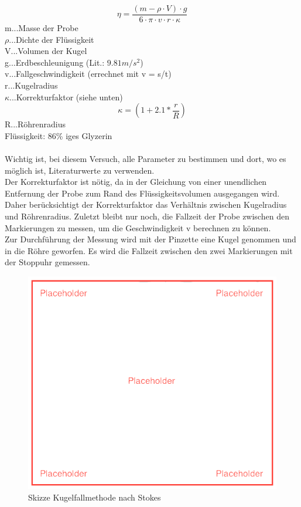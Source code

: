 \documentclass[12pt,a4paper]{article}
\begin{document}
\begin{multicols}{2}
$$\eta = \frac{(m-\rho \cdot V) \cdot g}{6 \cdot \pi \cdot v \cdot r \cdot \kappa}$$
m...Masse der Probe\\
$\rho$...Dichte der Flüssigkeit\\
V...Volumen der Kugel\\
g...Erdbeschleunigung (Lit.: $9.81m/s^2$)\\
v...Fallgeschwindigkeit (errechnet mit v = s/t)\\
r...Kugelradius\\
$\kappa$...Korrekturfaktor (siehe unten)\\
$$\kappa =  (1+2.1 * \frac{r}{R})$$
R...Röhrenradius\\
Flüssigkeit: 86\% iges Glyzerin\\
\\
Wichtig ist, bei diesem Versuch, alle Parameter zu bestimmen und dort, wo es möglich ist, Literaturwerte zu verwenden. \\
Der Korrekturfaktor ist nötig, da in der Gleichung von einer unendlichen Entfernung der Probe zum Rand des Flüssigkeitsvolumen ausgegangen wird. \\
Daher berücksichtigt der Korrekturfaktor das Verhältnis zwischen Kugelradius und Röhrenradius. Zuletzt bleibt nur noch, die Fallzeit der Probe zwischen den Markierungen zu messen, um die Geschwindigkeit v berechnen zu können.\\
Zur Durchführung der Messung wird mit der Pinzette eine Kugel genommen und in die Röhre geworfen. Es wird die Fallzeit zwischen den zwei Markierungen mit der Stoppuhr gemessen.
\begin{figure}[H]
	\centering
	\includegraphics[scale=0.4]{./figure/placeholder.png}
	\caption{Skizze Kugelfallmethode nach Stokes}
	\label{fig:visko_aufbau}
\end{figure}


\end{multicols}
\end{document}
